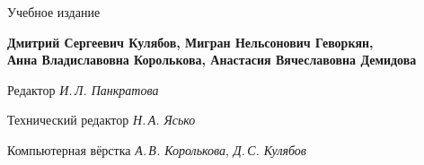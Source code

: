 \clearpage

\thispagestyle{empty}


\begin{center}
Учебное издание

\bigskip

  \begin{center}
    \textbf{\large{Дмитрий Сергеевич Кулябов, Мигран Нельсонович
        Геворкян, \\ Анна Владиславовна Королькова, Анастасия
        Вячеславовна Демидова}}
  \end{center}

\vspace{1cm}

   \begin{center}
    \textbf{\Large{\booktitle}}





     \bigskip

   \end{center}


\bigskip


\end{center}

\bigskip


\begin{center}
Редактор \emph{И.\,Л. Панкратова}




Технический редактор \emph{Н.\,А. Ясько}


Компьютерная вёрстка \textit{А.\,В. Королькова}, \textit{Д.\,С. Кулябов}

\end{center}


\vfill

